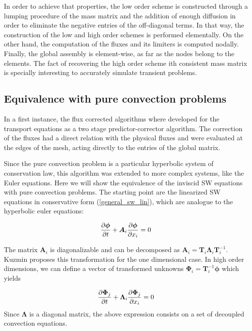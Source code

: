 In order to achieve that properties, the low order scheme is constructed through a lumping procedure of the mass matrix and the addition of enough diffusion in order to eliminate the negative entries of the off-diagonal terms. In that way, the construction of the low and high order schemes is performed elementally. On the other hand, the computation of the fluxes and its limiters is computed nodally. Finally, the global assembly is element-wise, as far as the nodes belong to the elements. The fact of recovering the high order scheme ith consistent mass matrix is specially interesting to accurately simulate transient problems.




\subsection{Equivalence with pure convection problems}

In a first instance, the flux corrected algorithms where developed for the transport equations as a two stage predictor-corrector algorithm. The correction of the fluxes had a direct relation with the physical fluxes and were evaluated at the edges of the mesh, acting directly to the entries of the global matrix.

Since the pure convection problem is a particular hyperbolic system of conservation law, this algorithm was extended to more complex systems, like the Euler equations. Here we will show the equivalence of the inviscid SW equations with pure convection problems.
The starting point are the linearized SW equations in conservative form (\ref{general_sw_lin}), which are analogue to the hyperbolic euler equations:

\begin{equation}
\frac{\partial\bm\phi}{\partial t} + \bm A_i \frac{\partial\bm\phi}{\partial x_i} = 0
\end{equation}

The matrix $\bm A_i$ is diagonalizable and can be decomposed as $\bm A_i = \bm T_i \bm\Lambda_i \bm T_i^{-1}$. Kuzmin \cite{kuzmin2005b} proposes this transformation for the one dimensional case. In high order dimensions, we can define a vector of transformed unknowns $\bm\Phi_i = \bm T_i^{-1}\bm\phi$ which yields


\begin{equation}
\frac{\partial\bm\Phi_j}{\partial t} + \bm\Lambda_i \frac{\partial\bm\Phi_j}{\partial x_i} = 0
\end{equation}
Since $\bm\Lambda$ is a diagonal matrix, the above expression consists on a set of decoupled convection equations.

